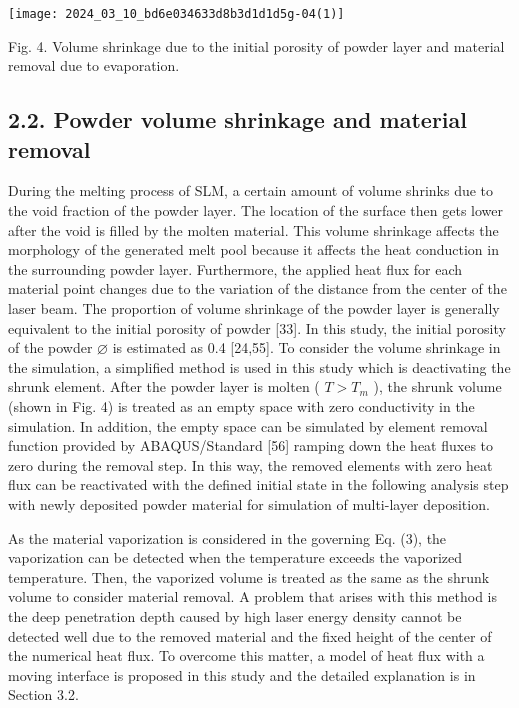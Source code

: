 \documentclass[10pt]{article}
\begin{document}
\begin{center}
\texttt{[image: 2024\_03\_10\_bd6e034633d8b3d1d1d5g-04(1)]}
\end{center}

Fig. 4. Volume shrinkage due to the initial porosity of powder layer and material removal due to evaporation.

\subsection*{2.2. Powder volume shrinkage and material removal}
During the melting process of SLM, a certain amount of volume shrinks due to the void fraction of the powder layer. The location of the surface then gets lower after the void is filled by the molten material. This volume shrinkage affects the morphology of the generated melt pool because it affects the heat conduction in the surrounding powder layer. Furthermore, the applied heat flux for each material point changes due to the variation of the distance from the center of the laser beam. The proportion of volume shrinkage of the powder layer is generally equivalent to the initial porosity of powder [33]. In this study, the initial porosity of the powder $\varnothing$ is estimated as 0.4 [24,55]. To consider the volume shrinkage in the simulation, a simplified method is used in this study which is deactivating the shrunk element. After the powder layer is molten ( $T>T_{m}$ ), the shrunk volume (shown in Fig. 4) is treated as an empty space with zero conductivity in the simulation. In addition, the empty space can be simulated by element removal function provided by ABAQUS/Standard [56] ramping down the heat fluxes to zero during the removal step. In this way, the removed elements with zero heat flux can be reactivated with the defined initial state in the following analysis step with newly deposited powder material for simulation of multi-layer deposition.

As the material vaporization is considered in the governing Eq. (3), the vaporization can be detected when the temperature exceeds the vaporized temperature. Then, the vaporized volume is treated as the same as the shrunk volume to consider material removal. A problem that arises with this method is the deep penetration depth caused by high laser energy density cannot be detected well due to the removed material and the fixed height of the center of the numerical heat flux. To overcome this matter, a model of heat flux with a moving interface is proposed in this study and the detailed explanation is in Section 3.2.
\end{document}
